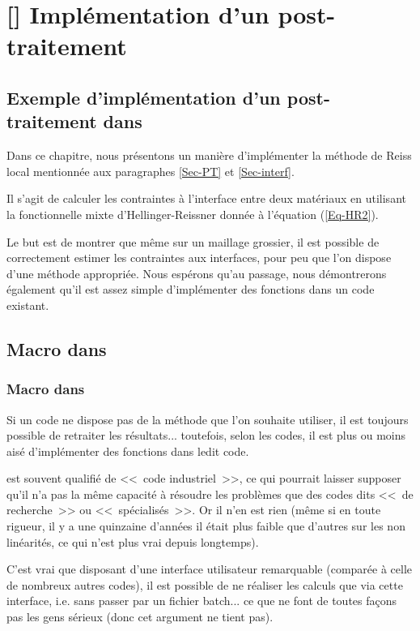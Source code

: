 \ifVersionAvecExemplesSepares
   \chapter{[\ansys] Implémentation d'un post-traitement}
\else
   \section{Exemple d'implémentation d'un post-traitement dans \ansys}
\fi

Dans ce chapitre, nous présentons un manière d'implémenter la méthode de Reiss local mentionnée aux
paragraphes \ref{Sec-PT} et \ref{Sec-interf}.

Il s'agit de calculer les contraintes à l'interface entre deux matériaux en utilisant la fonctionnelle mixte d'Hellinger-Reissner
donnée à l'équation (\ref{Eq-HR2}).

\medskip
Le but est de montrer que même sur un maillage grossier, il est possible de correctement estimer les contraintes 
aux interfaces, pour peu que l'on dispose d'une méthode appropriée. Nous espérons qu'au passage, nous
démontrerons également qu'il est assez simple d'implémenter des fonctions dans un code existant.





\medskip
\ifVersionAvecExemplesSepares
   \section{Macro dans \ansys}
\else
   \subsection{Macro dans \ansys}
\fi

Si un code ne dispose pas de la méthode que l'on souhaite utiliser, il est toujours possible de retraiter les
résultats... toutefois, selon les codes, il est plus ou moins aisé d'implémenter des fonctions dans ledit code.

\medskip
\ansys est souvent qualifié de <<~code industriel~>>, ce qui pourrait laisser supposer qu'il n'a pas la même capacité
à résoudre les problèmes que des codes dits <<~de recherche~>> ou <<~spécialisés~>>.
Or il n'en est rien (même si en toute rigueur, il y a une quinzaine d'années il était plus faible que d'autres sur
les non linéarités, ce qui n'est plus vrai depuis longtemps).

C'est vrai que disposant d'une interface utilisateur remarquable (comparée à celle de nombreux autres codes),
il est possible de ne réaliser les calculs que via cette interface, i.e. sans passer par un fichier batch... ce que ne
font de toutes façons pas les gens sérieux (donc cet argument ne tient pas).

